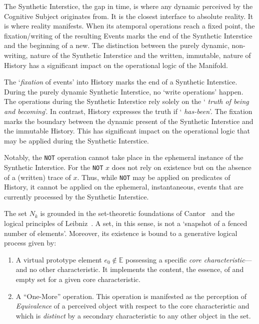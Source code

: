 \documentclass[11pt, a4paper]{article}
\theoremstyle{formalism}
\begin{document}
The Synthetic Interstice, the gap in time, is where any dynamic perceived by
the Cognitive Subject originates from. It is the closest interface to absolute
reality. It is where reality manifests. When its atemporal operations reach a
fixed point, the fixation/writing of the resulting Events marks the end of the
Synthetic Interstice and the beginning of a new. The distinction between the
purely dynamic, non-writing, nature of the Synthetic Interstice and the
written, immutable, nature of History has a significant impact on the
operational logic of the Manifold.

The `{\it fixation\/} of events' into History marks the end of a Synthetic
Interstice. During the purely dynamic Synthetic Interstice, no `write operations'
happen. The operations during the Synthetic Interstice rely solely on the `{\it
truth of being and becoming\/}'. In contrast, History expresses the truth if `{\it
has-been\/}'. The fixation marks the boundary between the dynamic present of
the Synthetic Interstice and the immutable History. This has significant impact
on the operational logic that may be applied during the Synthetic Interstice.

Notably, the {\tt NOT} operation cannot take place in the ephemeral instance of
the Synthetic Interstice. For the {\tt NOT} $x$ does not rely on existence but
on the absence of a (written) trace of $x$. Thus, while {\tt NOT} may be
applied on predicates of History, it cannot be applied on the ephemeral,
instantaneous, events that are currently processed by the Synthetic Interstice.

The set $N_k$ is grounded in the set-theoretic foundations of
Cantor~\cite{Cantor1895} and the logical principles of
Leibniz~\cite{Leibniz1714}. A set, in this sense, is not a `snapshot of a
fenced number of elements'. Moreover, its existence is bound to a generative
logical process given by:

\begin{enumerate}

    \item A virtual prototype element $e_0 \notin \mathbb{E}$ possessing a specific 
          {\it core characteristic\/}---and no other characteristic. It implements 
          the content, the essence, of and empty set for a given core characteristic.

    \item A ``One-More'' operation. This operation is manifested as the perception 
          of {\it Equivalence\/} of a perceived object with respect to the core 
          characteristic and which is {\it distinct\/} by a secondary characteristic 
          to any other object in the set.

\end{enumerate}
\end{document}
